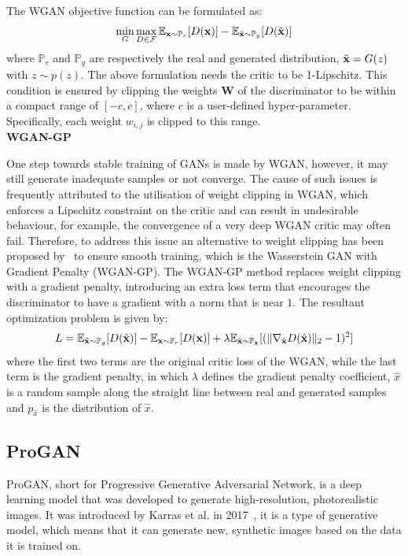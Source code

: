 \noindent The WGAN objective function can be formulated as:
\begin{equation}
    \min_G \max_{D \in \mathcal{F}} \mathbb{E}_{\mathbf{x} \sim \mathbb{P}_r} [D(\mathbf{x})] - \mathbb{E}_{\Tilde{\mathbf{x}} \sim \mathbb{P}_g}[D(\Tilde{\mathbf{x}})]
\end{equation}
where $\mathbb{P}_r$ and $\mathbb{P}_g$ are respectively the real and generated distribution, $\Tilde{\mathbf{x}} = G(z)$ with $z \sim p(z)$.
The above formulation needs the critic to be 1-Lipschitz. This condition is ensured by clipping the weights $\mathbf{W}$ of the discriminator to be within a compact range of $[-c ,c]$, where $c$ is a user-defined hyper-parameter. Specifically, each weight $w_{i,j}$ is clipped to this range.\\
%

\noindent \textbf{WGAN-GP}

\noindent One step towards stable training of GANs is made by WGAN, however, it may still generate inadequate samples or not converge. The cause of such issues is frequently attributed to the utilisation of weight clipping in WGAN, which enforces a Lipschitz constraint on the critic and can result in undesirable behaviour, for example, the convergence of a very deep WGAN critic may often fail. Therefore, to address this issue an alternative to weight clipping has been proposed by~\cite{wgan-gp} to ensure smooth training, which is the Wasserstein GAN with Gradient Penalty (WGAN-GP).
The WGAN-GP method replaces weight clipping with a gradient penalty, introducing an extra loss term that encourages the discriminator to have a gradient with a norm that is near $1$. The resultant optimization problem is given by: 
\begin{equation}
    L = \mathbb{E}_{\Tilde{\mathbf{x}}\sim \mathbb{P}_g}[D(\Tilde{\mathbf{x}})] - \mathbb{E}_{\mathbf{x}\sim \mathbb{P}_r}[D(\mathbf{x})] + \lambda \mathbb{E}_{\hat{\mathbf{x}}\sim \mathbb{P}_{\hat{\mathbf{x}}}} [( \| \nabla_{\hat{\mathbf{x}}} D( \hat{\mathbf{x}}) \|_2 - 1)^2]
\end{equation}
where the first two terms are the original critic loss of the WGAN, while the last term is the gradient penalty, in which $\lambda$ defines the gradient penalty coefficient, $\hat{x}$ is a random sample along the straight line between real and generated samples and $p_{\hat{x}}$ is the distribution of $\hat{x}$.
\subsection{ProGAN}
\label{sec:proGAN}
ProGAN, short for Progressive Generative Adversarial Network, is a deep learning model that was developed to generate high-resolution, photorealistic images. It was introduced by Karras et al. in 2017~\cite{ProGAN}, it is a type of generative model, which means that it can generate new, synthetic images based on the data it is trained on.

